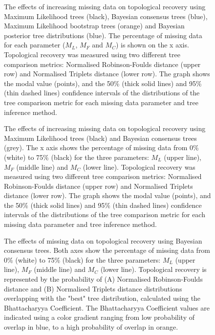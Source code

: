 \documentclass[12pt,letterpaper]{article}
\begin{document}

\begin{figure}
\caption{The effects of increasing missing data on topological recovery using Maximum Likelihood trees (black), Bayesian consensus trees (blue), Maximum Likelihood bootstrap trees (orange) and Bayesian posterior tree distributions (blue). The percentage of missing data for each parameter ($M_{L}$, $M_{F}$ and $M_{C}$) is shown on the x axis. Topological recovery was measured using two different tree comparison metrics: Normalised Robinson-Foulds distance (upper row) and Normalised Triplets distance (lower row). The graph shows the modal value (points), and the 50\% (thick solid lines) and 95\% (thin dashed lines) confidence intervals of the distributions of the tree comparison metric for each missing data parameter and tree inference method.}
\label{Fig_Results-permeth_perparam} %
\end{figure}

\begin{figure}
\caption{The effects of increasing missing data on topological recovery using Maximum Likelihood trees (black) and Bayesian consensus trees (grey). The x axis shows the percentage of missing data from 0\% (white) to 75\% (black) for the three parameters: $M_{L}$ (upper line), $M_{F}$ (middle line) and $M_{C}$ (lower line). Topological recovery was measured using two different tree comparison metrics: Normalised Robinson-Foulds distance (upper row) and Normalised Triplets distance (lower row). The graph shows the modal value (points), and the 50\% (thick solid lines) and 95\% (thin dashed lines) confidence intervals of the distributions of the tree comparison metric for each missing data parameter and tree inference method.} 
\label{Fig_Results-global_perparam} %
\end{figure}

\begin{figure}
\caption{The effects of missing data on topological recovery using Bayesian consensus trees. Both axes show the percentage of missing data from 0\% (white) to 75\% (black) for the three parameters: $M_{L}$ (upper line), $M_{F}$ (middle line) and $M_{C}$ (lower line). Topological recovery is represented by the probability of (A) Normalised Robinson-Foulds distance and (B) Normalised Triplets distance distributions overlapping with the "best" tree distribution, calculated using the Bhattacharyya Coefficient. The Bhattacharyya Coefficient values are indicated using a color gradient ranging from low probability of overlap in blue, to a high probability of overlap in orange.
}
\label{Fig_Results-paircomp_within}
\end{figure}
\end{document}
